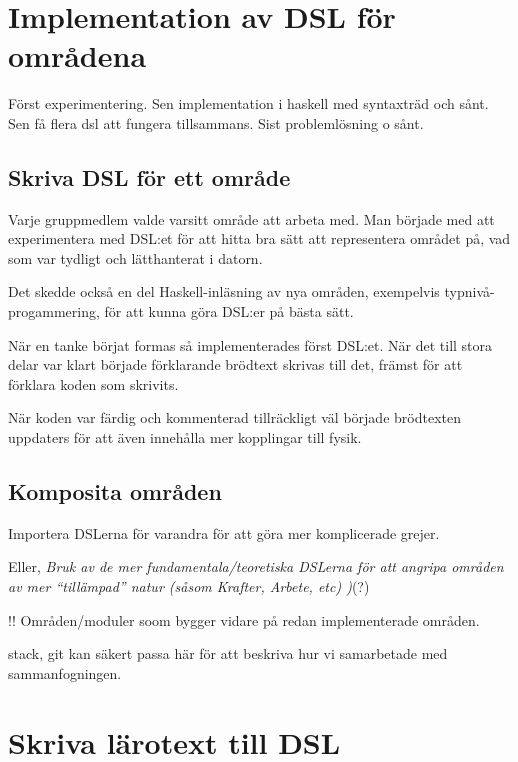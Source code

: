 \begin{binge}
  \section{Implementation av DSL för områdena}

  Först experimentering. Sen implementation i haskell med syntaxträd
  och sånt. Sen få flera dsl att fungera tillsammans. Sist
  problemlösning o sånt.

\subsection{Skriva DSL för ett område}

Varje gruppmedlem valde varsitt område att arbeta med. Man började med att
experimentera med DSL:et för att hitta bra sätt att representera området på,
vad som var tydligt och lätthanterat i datorn.

Det skedde också en del Haskell-inläsning av nya områden, exempelvis
typnivå-progammering, för att kunna göra DSL:er på bästa sätt.

När en tanke börjat formas så implementerades först DSL:et. När det till stora
delar var klart började förklarande brödtext skrivas till det, främst för att
förklara koden som skrivits.

När koden var färdig och kommenterad tillräckligt väl började brödtexten
uppdaters för att även innehålla mer kopplingar till fysik.

\subsection{Komposita områden}

Importera DSLerna för varandra för att göra mer komplicerade grejer.

Eller, \emph{Bruk av de mer fundamentala/teoretiska DSLerna för att
  angripa områden av mer ``tillämpad'' natur (såsom Krafter, Arbete,
  etc) )}(?)

!! Områden/moduler soom bygger vidare på redan implementerade områden.

stack, git kan säkert passa här för att beskriva hur vi samarbetade med sammanfogningen.

\section{Skriva lärotext till DSL}


\end{binge}
